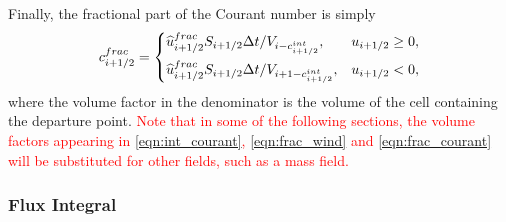 \documentclass{ametsocV6.1}
\newcommand{\change}[1]{\textcolor{red}{#1}}
\begin{document}
Finally, the fractional part of the Courant number is simply
\begin{equation} \label{eqn:frac_courant}
c^{frac}_{i+1/2} =
\begin{dcases}
\widehat{u}^{frac}_{i+1/2} S_{i+1/2}\Delta t / V_{i-c^{int}_{i+1/2}}, & u_{i+1/2} \geq 0, \\
\widehat{u}^{frac}_{i+1/2} S_{i+1/2}\Delta t / V_{i+1-c^{int}_{i+1/2}}, & u_{i+1/2} < 0,
\end{dcases}
\end{equation}
where the volume factor in the denominator is the volume of the cell containing the departure point.
\change{Note that in some of the following sections, the volume factors appearing in \eqref{eqn:int_courant}, \eqref{eqn:frac_wind} and \eqref{eqn:frac_courant} will be substituted for other fields, such as a mass field.}

\subsubsection{Flux Integral} \label{sec:ffsl_flux_integral}
\end{document}
